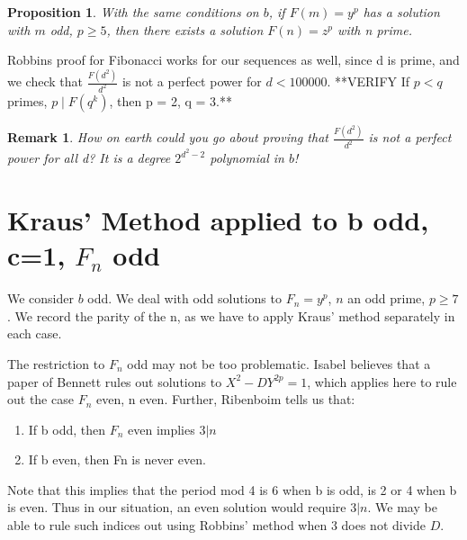 \documentclass[12pt]{article}
\newtheorem{prop}[thm]{Proposition}
\newenvironment{proof}[1][Proof.]{\begin{trivlist}
\item[\hskip \labelsep {\bfseries #1}]}{\end{trivlist}}
\newtheorem{rem}[thm]{Remark}
\begin{document}
\begin{prop}With the same conditions on $b$, if $F(m) = y^p$ has a solution with $m$ odd, $p \geq 5$, then there exists a solution $F(n) = z^p$ with n prime.
\end{prop}
\begin{proof}
Robbins proof for Fibonacci works for our sequences as well, since d is prime, and we check that $\frac{F(d^2)}{d^2}$ is not a perfect power for $d < 100000$.
**VERIFY If $p < q$ primes, $p \mid F(q^k)$, then p = 2, q = 3.**
\end{proof}
\begin{rem}
How on earth could you go about proving that $\frac{F(d^2)}{d^2}$ is not a perfect power for all d? It is a degree $2^{d^2-2}$ polynomial in $b$!
\end{rem}

\section{Kraus' Method applied to b odd, c=1, $F_n$ odd}
We consider $b$ odd.
We deal with odd solutions to $F_n = y^p$, $n$ an odd prime, $p \geq 7$. We record the parity of the n, as we have to apply Kraus' method separately in each case.

The restriction to $F_n$ odd may not be too problematic. Isabel believes that a paper of Bennett rules out solutions to $X^2-DY^{2p}=1$, which applies here to rule out the case $F_n$ even, n even. Further, Ribenboim tells us that:
\begin{enumerate}
\item If b odd, then $F_n$ even implies $3 | n$
\item If b even, then Fn is never even.
\end{enumerate}
Note that this implies that the period mod 4 is 6 when b is odd, is 2 or 4 when b is even. Thus in our situation, an even solution would require $3|n$. We may be able to rule such indices out using Robbins' method when 3 does not divide $D$.
\end{document}
